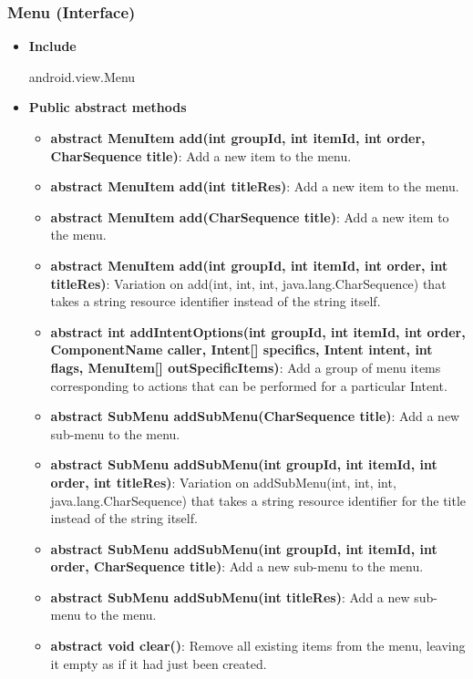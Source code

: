 \documentclass{report}
\begin{document}
    \pagebreak 
    \subsubsection{Menu (Interface)}
    \begin{itemize}
        \item \textbf{Include}
            \bigbreak \noindent 
            \begin{javacode}
                android.view.Menu
            \end{javacode}
        \item \textbf{Public abstract methods}
            \begin{itemize}
                \item \textbf{abstract MenuItem	add(int groupId, int itemId, int order, CharSequence title)}: Add a new item to the menu.
                \item \textbf{abstract MenuItem	add(int titleRes)}: Add a new item to the menu.
                \item \textbf{abstract MenuItem	add(CharSequence title)}: Add a new item to the menu.
                \item \textbf{abstract MenuItem	add(int groupId, int itemId, int order, int titleRes)}: Variation on add(int, int, int, java.lang.CharSequence) that takes a string resource identifier instead of the string itself.
                \item \textbf{abstract int	addIntentOptions(int groupId, int itemId, int order, ComponentName caller, Intent[] specifics, Intent intent, int flags, MenuItem[] outSpecificItems)}: Add a group of menu items corresponding to actions that can be performed for a particular Intent.
                \item \textbf{abstract SubMenu	addSubMenu(CharSequence title)}: Add a new sub-menu to the menu.
                \item \textbf{abstract SubMenu	addSubMenu(int groupId, int itemId, int order, int titleRes)}: Variation on addSubMenu(int, int, int, java.lang.CharSequence) that takes a string resource identifier for the title instead of the string itself.
                \item \textbf{abstract SubMenu	addSubMenu(int groupId, int itemId, int order, CharSequence title)}: Add a new sub-menu to the menu.
                \item \textbf{abstract SubMenu	addSubMenu(int titleRes)}: Add a new sub-menu to the menu.
                \item \textbf{abstract void	clear()}: Remove all existing items from the menu, leaving it empty as if it had just been created.

\end{itemize}
\end{itemize}
\end{document}
